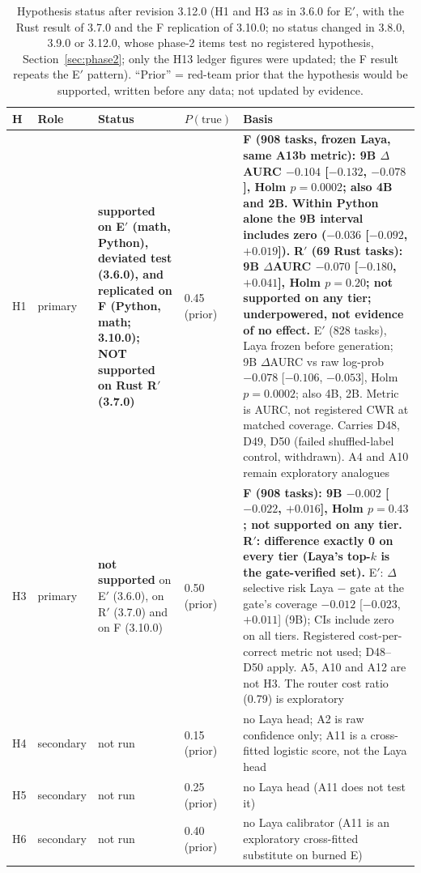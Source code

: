 \documentclass[11pt,a4paper]{article}
\begin{document}
\begin{table}[!htbp]\centering\small
\caption{Hypothesis status after revision 3.12.0 (H1 and H3 as in 3.6.0 for E$'$, with the Rust result of 3.7.0 and the F replication of 3.10.0; no status changed in 3.8.0, 3.9.0 or 3.12.0, whose phase-2 items test no registered hypothesis, Section~\ref{sec:phase2}; only the H13 ledger figures were updated; the F result repeats the E$'$ pattern). ``Prior'' = red-team prior that the hypothesis would be supported, written before any data; not updated by evidence.}
\label{tab:verdict}
\begin{tabular}{l l p{2.3cm} l p{5.6cm}}\toprule
H & Role & Status & $P(\text{true})$ & Basis\\\midrule
H1 & primary & \textbf{supported on E$'$ (math, Python), deviated test (3.6.0), and replicated on F (Python, math; 3.10.0); NOT supported on Rust R$'$ (3.7.0)} & 0.45 (prior) & \textbf{F (908 tasks, frozen Laya, same A13b metric): 9B $\Delta$AURC $-0.104$ [$-0.132$, $-0.078$], Holm $p=0.0002$; also 4B and 2B. Within Python alone the 9B interval includes zero ($-0.036$ [$-0.092$, $+0.019$]).} \textbf{R$'$ (69 Rust tasks): 9B $\Delta$AURC $-0.070$ [$-0.180$, $+0.041$], Holm $p=0.20$; not supported on any tier; underpowered, not evidence of no effect.} E$'$ (828 tasks), Laya frozen before generation; 9B $\Delta$AURC vs raw log-prob $-0.078$ [$-0.106$, $-0.053$], Holm $p=0.0002$; also 4B, 2B. Metric is AURC, not registered CWR at matched coverage. Carries D48, D49, D50 (failed shuffled-label control, withdrawn). A4 and A10 remain exploratory analogues\\
H3 & primary & \textbf{not supported} on E$'$ (3.6.0), on R$'$ (3.7.0) and on F (3.10.0) & 0.50 (prior) & \textbf{F (908 tasks): 9B $-0.002$ [$-0.022$, $+0.016$], Holm $p=0.43$; not supported on any tier.} \textbf{R$'$: difference exactly 0 on every tier (Laya's top-$k$ is the gate-verified set).} E$'$: $\Delta$ selective risk Laya $-$ gate at the gate's coverage $-0.012$ [$-0.023$, $+0.011$] (9B); CIs include zero on all tiers. Registered cost-per-correct metric not used; D48--D50 apply. A5, A10 and A12 are not H3. The router cost ratio (0.79) is exploratory\\
H4 & secondary & not run & 0.15 (prior) & no Laya head; A2 is raw confidence only; A11 is a cross-fitted logistic score, not the Laya head\\
H5 & secondary & not run & 0.25 (prior) & no Laya head (A11 does not test it)\\
H6 & secondary & not run & 0.40 (prior) & no Laya calibrator (A11 is an exploratory cross-fitted substitute on burned E)\\

\end{tabular}
\end{table}
\end{document}

